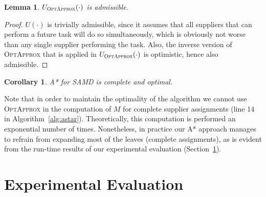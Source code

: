 \documentclass[letterpaper]{article} %
\newtheorem{corollary}{Corollary}
\newtheorem{lemma}{Lemma}
\newcommand{\samd}{\ac{SAMD}\xspace}
\newcommand{\astar}{\textsc{A*}\xspace}
\newcommand{\optapprox}{\textsc{OptApprox}\xspace}
\begin{document}
\begin{lemma}
$U_{\optapprox}(\cdot)$ is admissible.
\label{lem:admissible}
\end{lemma}

\begin{proof}
$U(\cdot)$ is trivially admissible, since it assumes that all suppliers that can perform a future task will do so simultaneously, which is obviously not worse than any single supplier performing the task. Also, the inverse version of \optapprox that is applied in $U_{\optapprox}(\cdot)$ is optimistic, hence also admissible.
\end{proof}

\begin{corollary}
\astar for \samd is complete and optimal.
\end{corollary}

Note that in order to maintain the optimality of the algorithm we cannot use \optapprox in the computation of $M$ for complete supplier assignments (line 14 in Algorithm~\ref{alg:astar}). Theoretically, this computation is performed an exponential number of times. Nonetheless, in practice our \astar approach manages to refrain from expanding most of the leaves (complete assignments), as is evident from the run-time results of our experimental evaluation (Section~\ref{sec:exp}).



	
\section{Experimental Evaluation}
\label{sec:exp}
\end{document}
